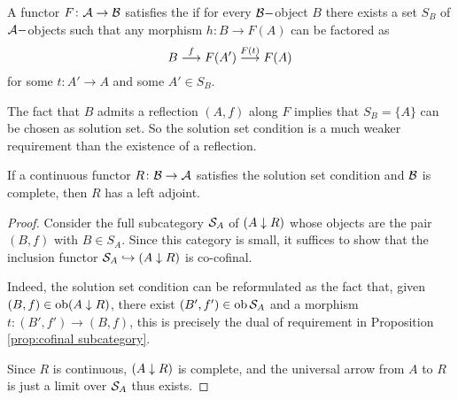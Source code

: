   \begin{defn}
    A functor $F\colon {\cal A}\to {\cal B}$ satisfies the  if for every ${\cal B}-$object $B$ there exists a set $S_B$ of ${\cal A}-$objects such that any morphism $h\colon B \to F(A)$ can be factored as
    \begin{equation*}
      B\stackrel{{f}}{\longrightarrow}F(A')\stackrel{{F(t)}}{\longrightarrow}F(A)
    \end{equation*}
    for some $t\colon A'\to A$ and some $A'\in S_B$.
  \end{defn}
  \begin{rem}
    The fact that $B$ admits a reflection $(A,f)$ along $F$ implies that $S_B = \{A\}$ can be chosen as solution set. So the solution set condition is a much weaker requirement than the existence of a reflection.
  \end{rem}

  \begin{thm}
    If a continuous functor $R\colon{\cal B}\to{\cal A}$ satisfies the solution set condition and ${\cal B}$ is complete, then $R$ has a left adjoint.
  \end{thm}
  \begin{proof}
    Consider the full subcategory ${\cal S}_A$ of $(A\downarrow R)$ whose objects are the pair $(B,f)$ with $B\in S_A$. Since this category is small, it suffices to show that the inclusion functor ${\cal S}_A\hookrightarrow(A\downarrow R)$ is co-cofinal.

    Indeed, the solution set condition can be reformulated as the fact that, given $(B,f)\in\operatorname{ob}(A \downarrow R)$, there exist $(B',f')\in\operatorname{ob}{\cal S}_A$ and a morphism $t\colon(B', f') \to (B, f)$, this is precisely the dual of requirement in Proposition \ref{prop:cofinal subcategory}.

    Since $R$ is continuous, $(A\downarrow R)$ is complete, and the universal arrow from $A$ to $R$ is just a limit over ${\cal S}_A$ thus exists.
  \end{proof}

